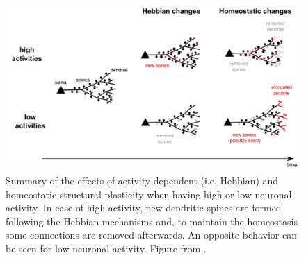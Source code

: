 \documentclass[a4paper, 12pt, twoside, openright]{book}
\begin{document}
\begin{figure}[ht]
    \centering
    \includegraphics[width=\columnwidth]{figures/summary_str_pl.png}
    \caption{Summary of the effects of activity-dependent (i.e. Hebbian) and homeostatic structural plasticity when having high or low neuronal activity. In case of high activity, new dendritic spines are formed following the Hebbian mechanisms and, to maintain the homeostasis some connections are removed afterwards. An opposite behavior can be seen for low neuronal activity. Figure from \cite{Fauth2016}.}
    \label{fig:str_pl_effects}
\end{figure}
\end{document}
